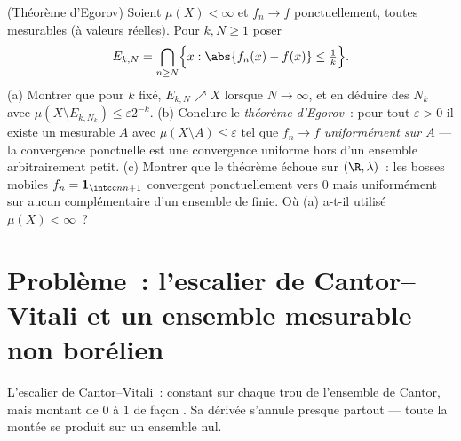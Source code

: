 \begin{exercise}[$\star\star\star$]\label{exo:b3:measure:12}
(Théorème d'Egorov) Soient $\mu(X) < \infty$ et $f_n \to f$
ponctuellement, toutes mesurables (à valeurs réelles). Pour
$k, N \geq 1$ poser
\[
E_{k,N} = \bigcap_{n \geq N}\Bigl\{x : \abs{f_n(x) - f(x)}
\leq \tfrac1k\Bigr\} .
\]
(a) Montrer que pour $k$ fixé, $E_{k,N} \nearrow X$ lorsque
$N \to \infty$, et en déduire des $N_k$ avec $\mu(X
\setminus E_{k,N_k}) \leq \varepsilon2^{-k}$.
(b) Conclure le \emph{théorème d'Egorov}~: pour tout
$\varepsilon > 0$ il existe un mesurable $A$ avec
$\mu(X\setminus A) \leq \varepsilon$ tel que $f_n \to f$
\emph{uniformément sur $A$} --- la convergence ponctuelle
est une convergence uniforme hors d'un ensemble
arbitrairement petit.
(c) Montrer que le théorème échoue sur $(\R, \lambda)$~: les
bosses mobiles $f_n = \mathbf 1_{\intcc n{n+1}}$ convergent
ponctuellement vers $0$ mais uniformément sur aucun
complémentaire d'un ensemble de  finie. Où (a) a-t-il
utilisé $\mu(X) < \infty$~?
\end{exercise}

\section{Problème~: l'escalier de Cantor--Vitali et un
ensemble mesurable non borélien}

\begin{omfigure}

{\small L'escalier de Cantor--Vitali~: constant sur chaque
trou de l'ensemble de Cantor, mais montant de $0$ à $1$ de
façon . Sa dérivée s'annule presque partout --- toute
la montée se produit sur un ensemble nul.}
\end{omfigure}

